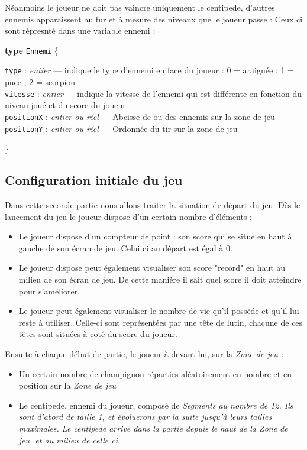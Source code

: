 \documentclass[a4paper, 12pt, twoside]{article}
\newenvironment{typeag}[1][]{\noindent \textbf{type} \texttt{#1} \{\begin{addmargin}[2em]{0em}}{\end{addmargin}\}}
\newcommand{\variable}[3]{\noindent \texttt{#1} : \textit{#2} --- #3}
\begin{document}
Néanmoins le joueur ne doit pas vaincre uniquement le centipede, d'autres ennemis apparaissent au fur et à mesure des niveaux que le joueur passe : 
Ceux ci sont répresnté dans une variable ennemi : 

\begin{typeag}[Ennemi]
        \variable{type}{entier}{indique le type d'ennemi en face du joueur : 0 = araignée ; 1 = puce ; 2 = scorpion}\\
        \variable{vitesse}{entier}{indique la vitesse de l'ennemi qui est différente en fonction du niveau joué et du score du joueur}\\
        \variable{positionX}{entier ou réel}{Abcisse de ou des ennemis sur la zone de jeu}\\
        \variable{positionY}{entier ou réel}{Ordonnée du tir sur la zone de jeu}
\end{typeag}


\subsection{Configuration initiale du jeu}
Dans cette seconde partie nous allons traiter la situation de départ du jeu. Dès le lancement du jeu le joueur dispose d'un certain nombre d'éléments : 

\begin{itemize}
\item 
	Le joueur dispose d'un compteur de point : son score qui se situe en haut à gauche de son écran de jeu. Celui ci au départ est égal à 0.
	\item 
	Le joueur dispose peut également visualiser son score "record" en haut au milieu de son écran de jeu. De cette manière il sait quel score il doit atteindre pour s'améliorer.
	\item
	Le joueur peut également visualiser le nombre de vie qu'il possède et qu'il lui reste à utiliser. Celle-ci sont représentées par une tête de lutin, chacune de ces têtes sont situées à coté du score du joueur.
\end{itemize}


Ensuite à chaque début de partie, le joueur à devant lui, sur la  \itshape{Zone de jeu} : 

\begin{itemize}
	\item
	Un certain nombre de champignon réparties aléatoirement en nombre et en position sur la  \itshape{Zone de jeu}
	\item
	Le centipede, ennemi du joueur, composé de \itshape{Segments} au nombre de 12. Ils sont d'abord de taille 1, et évoluerons par la suite jusqu'à leurs tailles maximales. Le centipede arrive dans la partie depuis le haut de la \itshape{Zone de jeu}, et au milieu de celle ci. 
\end{itemize}
 
\end{document}
